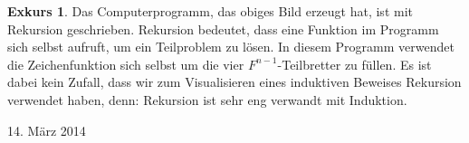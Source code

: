\documentclass[a4paper,ngerman,12pt]{scrartcl}
\newcommand{\datum}[1]{\hfill {#1}\\}
\theoremstyle{definition}
\newtheorem*{exk}{Exkurs}
\newenvironment{exkurs}{\begin{shaded}\begin{exk}}{\end{exk}\end{shaded}}
\begin{document}
\begin{exkurs}
  Das Computerprogramm, das obiges Bild erzeugt hat, ist mit Rekursion geschrieben. Rekursion bedeutet, dass eine Funktion im Programm sich selbst aufruft, um ein Teilproblem zu lösen. In diesem Programm verwendet die Zeichenfunktion sich selbst um die vier $F^{n-1}$-Teilbretter zu füllen. Es ist dabei kein Zufall, dass wir zum Visualisieren eines induktiven Beweises Rekursion verwendet haben, denn: Rekursion ist sehr eng verwandt mit Induktion.
\end{exkurs}

\datum{14. März 2014}

\end{document}
